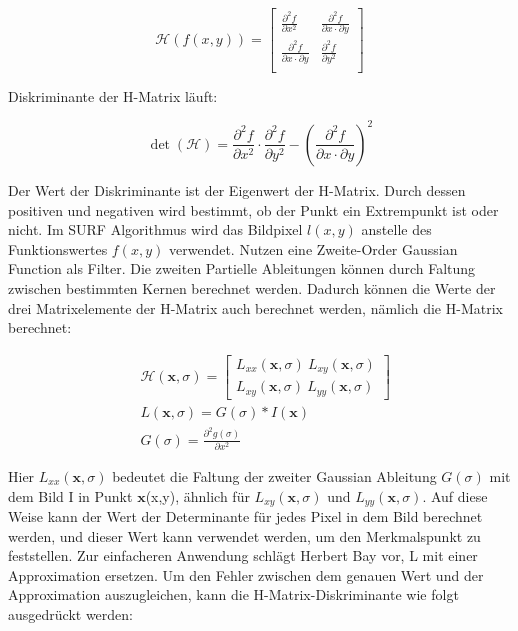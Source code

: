 \begin{equation}
   \mathcal{H}(f(x,y)) = \begin{bmatrix}
   \frac{\partial^{2}f}{\partial x^{2}} & \frac{\partial^{2}f}{\partial x \cdot \partial y} \\
   \frac{\partial^{2}f}{\partial x \cdot \partial y} & \frac{\partial^{2}f}{\partial y^{2}} \\   
   \end{bmatrix}
\end{equation}

 Diskriminante der H-Matrix läuft:
 
\begin{equation}
   \det(\mathcal{H}) = \frac{\partial^{2}f}{\partial x^{2}} \cdot \frac{\partial^{2}f}{\partial y^{2}} - (\frac{\partial^{2}f}{\partial x \cdot \partial y})^2  
\end{equation}

Der Wert der Diskriminante ist der Eigenwert der H-Matrix. Durch dessen positiven und negativen wird bestimmt, ob der Punkt ein Extrempunkt ist oder nicht. Im SURF Algorithmus wird das Bildpixel $l(x,y)$ anstelle des Funktionswertes $f(x,y)$ verwendet. Nutzen eine Zweite-Order Gaussian Function als Filter. Die zweiten Partielle Ableitungen können durch Faltung zwischen bestimmten Kernen berechnet werden. Dadurch können die Werte der drei Matrixelemente der H-Matrix auch berechnet werden, nämlich die H-Matrix berechnet:

\begin{equation}
\begin{split}
   &\mathcal{H}(\textbf{x},\sigma) = \begin{bmatrix}
   L_{xx}(\textbf{x},\sigma)\ L_{xy}(\textbf{x},\sigma) \\
   L_{xy}(\textbf{x},\sigma)\ L_{yy}(\textbf{x},\sigma)
   \end{bmatrix} \\   
   &L(\textbf{x},\sigma) = G(\sigma)*I(\textbf{x}) \\  
   &G(\sigma) = \frac{\partial^{2}g(\sigma)}{\partial x^{2}}      
\end{split}
\end{equation}


Hier $L_{xx}(\textbf{x},\sigma)$ bedeutet die Faltung der zweiter Gaussian Ableitung $G(\sigma)$ mit dem Bild I in Punkt $\textbf{x}$(x,y), ähnlich für $L_{xy}(\textbf{x},\sigma)$ und $L_{yy}(\textbf{x},\sigma)$. Auf diese Weise kann der Wert der Determinante für jedes Pixel in dem Bild berechnet werden, und dieser Wert kann verwendet werden, um den Merkmalspunkt zu feststellen.
Zur einfacheren Anwendung schlägt Herbert Bay\cite{Surf} vor, L mit einer Approximation ersetzen. Um den Fehler zwischen dem genauen Wert und der Approximation auszugleichen, kann die H-Matrix-Diskriminante wie folgt ausgedrückt werden:

